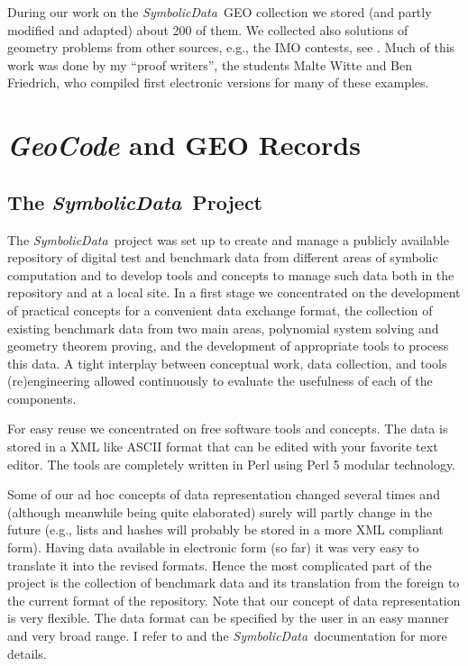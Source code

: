 \documentclass[11pt]{article}
\newcommand{\GC}{\textit{Geo\-Code}}
\newcommand{\SD}{\textit{Symbolic\-Data}}
\begin{document}
During our work on the \SD\ GEO collection we stored (and partly modified and
adapted) about 200 of them. We collected also solutions of geometry problems
from other sources, e.g., the IMO contests, see \cite{IMO}. Much of this work
was done by my ``proof writers'', the students Malte Witte and Ben Friedrich,
who compiled first electronic versions for many of these examples.

\section{{\GC} and GEO Records}

\subsection{The \SD\ Project}

The \SD\ project was set up to create and manage a publicly available
repository of digital test and benchmark data from different areas of symbolic
computation and to develop tools and concepts to manage such data both in the
repository and at a local site.  In a first stage we concentrated on the
development of practical concepts for a convenient data exchange format, the
collection of existing benchmark data from two main areas, polynomial system
solving and geometry theorem proving, and the development of appropriate tools
to process this data.  A tight interplay between conceptual work, data
collection, and tools (re)engineering allowed continuously to evaluate the
usefulness of each of the components.

For easy reuse we concentrated on free software tools and concepts.  The data
is stored in a XML like ASCII format that can be edited with your favorite
text editor.  The tools are completely written in Perl using Perl 5 modular
technology.

Some of our ad hoc concepts of data representation changed several times and
(although meanwhile being quite elaborated) surely will partly change in the
future (e.g., lists and hashes will probably be stored in a more XML compliant
form). Having data available in electronic form (so far) it was very easy to
translate it into the revised formats. Hence the most complicated part of the
project is the collection of benchmark data and its translation from the
foreign to the current format of the repository.  Note that our concept of
data representation is very flexible. The data format can be specified by the
user in an easy manner and very broad range. I refer to \cite{Bachmann_00a,
  karlsruhe-02, rwca-02} and the \SD\ documentation for more details.
\end{document}
